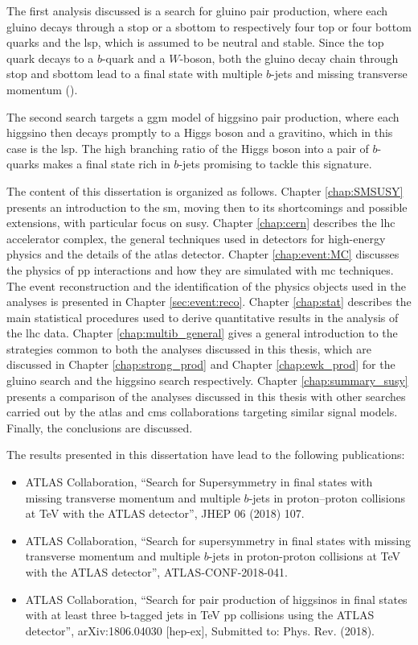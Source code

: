 The first analysis discussed is a search for gluino pair production, where each gluino decays through a stop or a sbottom 
to respectively four top or four bottom quarks and the \gls{lsp}, which is assumed to be neutral and stable.
Since the top quark decays to a $b$-quark and a $W$-boson, both the gluino decay chain through stop and sbottom lead to a 
final state with multiple $b$-jets and missing transverse momentum (\met). 

The second search targets a \gls{ggm} model of higgsino pair production, where each higgsino then decays promptly to a Higgs boson and 
a gravitino, which in this case is the \gls{lsp}. The high branching ratio of the Higgs boson into a pair of $b$-quarks makes a final state 
rich in $b$-jets promising to tackle this signature.

The content of this dissertation is organized as follows. Chapter \ref{chap:SMSUSY} presents an introduction to the \gls{sm}, 
moving then to its shortcomings and possible extensions, with particular focus on \gls{susy}. 
Chapter \ref{chap:cern} describes the \gls{lhc} accelerator complex, the general techniques used in detectors 
for high-energy physics and the details of the \gls{atlas} detector. 
Chapter \ref{chap:event:MC} discusses the physics of \gls{pp} interactions and how they are simulated with \gls{mc} techniques. 
The event reconstruction and the identification of the physics objects used in the analyses is presented in Chapter \ref{sec:event:reco}. 
Chapter \ref{chap:stat} describes the main statistical procedures used to derive quantitative results in the analysis of the \gls{lhc} data.
Chapter \ref{chap:multib_general} gives a general introduction to the strategies common to both the analyses discussed in this thesis, 
which are discussed in Chapter \ref{chap:strong_prod} and Chapter \ref{chap:ewk_prod} for the gluino search and the  
higgsino search respectively. 
Chapter \ref{chap:summary_susy} presents a comparison of the analyses discussed in this thesis with other searches carried out 
by the \gls{atlas} and \gls{cms} collaborations targeting similar signal models. 
Finally, the conclusions are discussed. 

The results presented in this dissertation have lead to the following publications:

\begin{itemize}
\item  ATLAS Collaboration, ``Search for Supersymmetry in final states with missing transverse momentum and multiple $b$-jets in proton–proton collisions at \cmtre TeV with the ATLAS detector'', JHEP 06 (2018) 107. 
\item  ATLAS Collaboration, ``Search for supersymmetry in final states with missing transverse momentum and multiple $b$-jets in proton-proton collisions at \cmtre TeV with the ATLAS detector'', ATLAS-CONF-2018-041.
\item  ATLAS Collaboration, ``Search for pair production of higgsinos in final states with at least three b-tagged jets in \cmtre TeV pp collisions using the ATLAS detector'',  
arXiv:1806.04030 [hep-ex], 
Submitted to: Phys. Rev. (2018).
\end{itemize}

